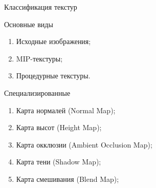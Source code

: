 \documentclass{beamer}
\begin{document}
	\begin{frame}{Классификация текстур}

		Основные виды
		\begin{enumerate}
			\item Исходные изображения;
			\item MIP-текстуры;
			\item Процедурные текстуры. %
		\end{enumerate}
		
		Специализированные
		\begin{enumerate}
			\item Карта нормалей (Normal Map);
			\item Карта высот (Height Map);
			
			\item Карта окклюзии (Ambient Occlusion Map);
			\item Карта тени (Shadow Map);
		
			\item Карта смешивания (Blend Map);
		\end{enumerate}

	\end{frame}
\end{document}
